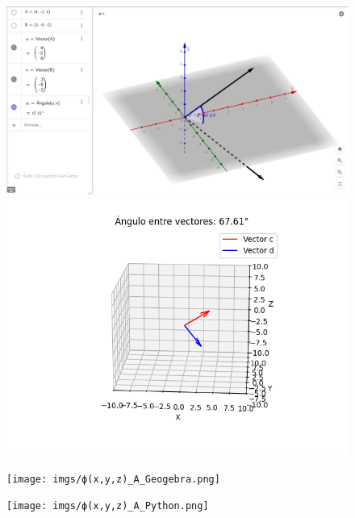 \documentclass{article}
\begin{document}
\begin{figure}[h!]
    \centering
    \begin{minipage}{0.45\textwidth}
        \centering
        \includegraphics[width=\textwidth]{imgs/vectores_CD_Geogebra.png}
    \end{minipage}
    \hfill
    \begin{minipage}{0.45\textwidth}
        \centering
        \includegraphics[width=\textwidth]{imgs/vectores_CD_python.png}
    \end{minipage}
    
    \vspace{0.5cm}
    
    \begin{minipage}{0.45\textwidth}
        \centering
        \texttt{[image: imgs/ϕ(x,y,z)\_A\_Geogebra.png]}
    \end{minipage}
    \hfill
    \begin{minipage}{0.45\textwidth}
        \centering
        \texttt{[image: imgs/ϕ(x,y,z)\_A\_Python.png]}
    \end{minipage}
    

\end{figure}
\end{document}
